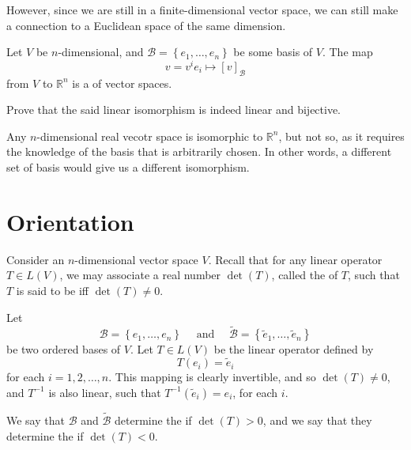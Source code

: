 \documentclass[notoc,notitlepage]{tufte-book}
\begin{document}
However, since we are still in a finite-dimensional vector space, we can still make a connection to a Euclidean space of the same dimension.

\begin{defn}\label{defn:linear_isomorphism}
  Let $V$ be $n$-dimensional, and $\mathcal{B} = \left\{ e_1, \ldots, e_n \right\}$ be some basis of $V$. The map
  \begin{equation*}
    v = v^i e_i \mapsto [v]_{\mathcal{B}}
  \end{equation*}
  from $V$ to $\mathbb{R}^n$ is a  of vector spaces.
\end{defn}

\begin{ex}
  Prove that the said linear isomorphism is indeed linear and bijective.
\end{ex}

\begin{note}
  Any $n$-dimensional real vecotr space is isomorphic to $\mathbb{R}^n$, but not  so, as it requires the knowledge of the basis that is arbitrarily chosen. In other words, a different set of basis would give us a different isomorphism.
\end{note}


\section{Orientation}%
\label{sec:orientation}

Consider an $n$-dimensional vector space $V$. Recall that for any linear operator $T \in L(V)$, we may associate a real number $\det(T)$, called the  of $T$, such that $T$ is said to be  iff $\det(T) \neq 0$.

\begin{defn}\label{defn:same_and_opposite_orientations}
  Let
  \begin{equation*}
    \mathcal{B} = \left\{ e_1, \ldots, e_n \right\} \quad \text{ and } \quad \tilde{\mathcal{B}} = \left\{ \tilde{e}_1, \ldots, \tilde{e}_n \right\}
  \end{equation*}
  be two ordered bases of $V$. Let $T \in L(V)$ be the linear operator defined by
  \begin{equation*}
    T(e_i) = \tilde{e}_i
  \end{equation*}
  for each $i = 1, 2, \ldots, n$. This mapping is clearly invertible, and so $\det(T) \neq 0$, and $T^{-1}$ is also linear, such that $T^{-1} \left( \tilde{e}_i \right) = e_i$, for each $i$.

  We say that $\mathcal{B}$ and $\tilde{\mathcal{B}}$ determine the  if $\det(T) > 0$, and we say that they determine the  if $\det(T) < 0$.
\end{defn}
\end{document}
